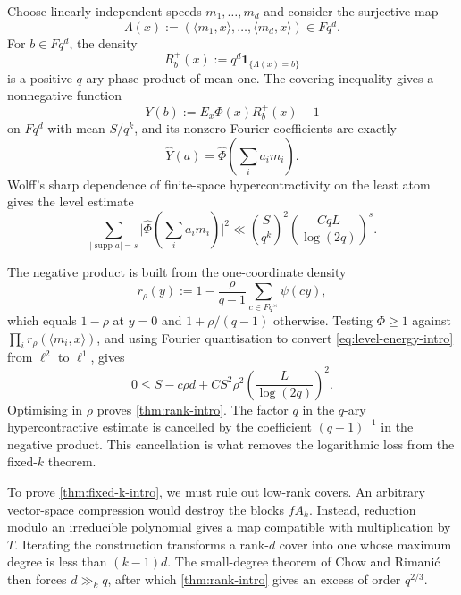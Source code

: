 \documentclass[11pt,reqno]{amsart}
\numberwithin{equation}{section}
\theoremstyle{definition}
\theoremstyle{remark}
\DeclareMathOperator{\supp}{supp}
\newcommand{\Fq}{\mathbb F_q}
\newcommand{\E}{\mathbb E}
\newcommand{\one}{\mathbf 1}
\newcommand{\wh}{\widehat}
\newcommand{\abs}[1]{\lvert#1\rvert}
\newcommand{\angles}[1]{\langle#1\rangle}
\def\Fq{Fq}%
\def\mathbb#1{#1}%
\begin{document}
Choose linearly independent speeds $m_1,\ldots,m_d$ and consider the surjective map
\[
 \Lambda(x)
 :=(\angles{m_1,x},\ldots,\angles{m_d,x})
 \in\Fq^d.
\]
For $b\in\Fq^d$, the density
\[
 R_b^+(x):=q^d\one_{\{\Lambda(x)=b\}}
\]
is a positive $q$-ary phase product of mean one.  The covering inequality gives a nonnegative function
\[
 Y(b):=\E_x\Phi(x)R_b^+(x)-1
\]
on $\Fq^d$ with mean $S/q^k$, and its nonzero Fourier coefficients are exactly
\[
 \wh Y(a)=\wh\Phi\left(\sum_i a_im_i\right).
\]
Wolff's sharp dependence of finite-space hypercontractivity on the least atom
\cite{Wolff} gives the level estimate
\begin{equation}\label{eq:level-energy-intro}
 \sum_{|\supp a|=s}
 \abs{\wh\Phi\left(\sum_i a_im_i\right)}^2
 \ll
 \left(\frac{S}{q^k}\right)^2
 \left(
   \frac{CqL}{\log(2q)}
 \right)^s.
\end{equation}

The negative product is built from the one-coordinate density
\[
 r_\rho(y)
 :=1-\frac{\rho}{q-1}
 \sum_{c\in\Fq^\times}\psi(cy),
\]
which equals $1-\rho$ at $y=0$ and
$1+\rho/(q-1)$ otherwise.  Testing $\Phi\ge1$ against
$\prod_i r_\rho(\angles{m_i,x})$, and using Fourier quantisation to convert \eqref{eq:level-energy-intro} from $\ell^2$ to $\ell^1$, gives
\begin{equation}\label{eq:master-intro}
 0\le
 S-c\rho d
 +CS^2\rho^2
 \left(\frac{L}{\log(2q)}\right)^2.
\end{equation}
Optimising in $\rho$ proves \cref{thm:rank-intro}.  The factor $q$ in the $q$-ary hypercontractive estimate is cancelled by the coefficient $(q-1)^{-1}$ in the negative product.  This cancellation is what removes the logarithmic loss from the fixed-$k$ theorem.

To prove \cref{thm:fixed-k-intro}, we must rule out low-rank covers.  An arbitrary vector-space compression would destroy the blocks $fA_k$.  Instead, reduction modulo an irreducible polynomial gives a map compatible with multiplication by $T$.  Iterating the construction transforms a rank-$d$ cover into one whose maximum degree is less than $(k-1)d$.  The small-degree theorem of Chow and Rimani\'c then forces $d\gg_kq$, after which \cref{thm:rank-intro} gives an excess of order $q^{2/3}$.
\end{document}

